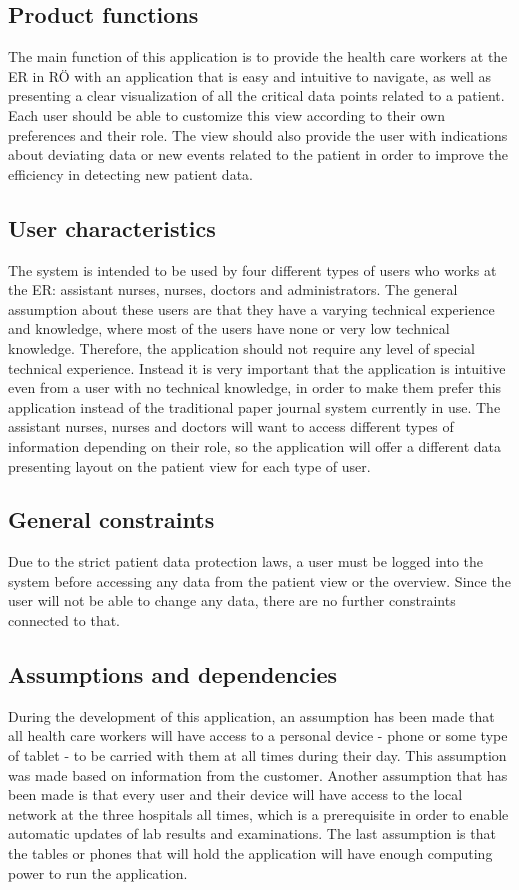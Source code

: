 \subsection{Product functions}
The main function of this application is to provide the health care workers at the ER in RÖ with an application that is easy and intuitive to navigate, as well as presenting a clear visualization of all the critical data points related to a patient. Each user should be able to customize this view according to their own preferences and their role. The view should also provide the user with indications about deviating data or new events related to the patient in order to improve the efficiency in detecting new patient data.

\subsection{User characteristics}
The system is intended to be used by four different types of users who works at the ER: assistant nurses, nurses, doctors and administrators. The general assumption about these users are that they have a varying technical experience and knowledge, where most of the users have none or very low technical knowledge. Therefore, the application should not require any level of special technical experience. Instead it is very important that the application is intuitive even from a user with no technical knowledge, in order to make them prefer this application instead of the traditional paper journal system currently in use.
The assistant nurses, nurses and doctors will want to access different types of information depending on their role, so the application will offer a different data presenting layout on the patient view for each type of user. 

\subsection{General constraints}
Due to the strict patient data protection laws, a user must be logged into the system before accessing any data from the patient view or the overview. Since the user will not be able to change any data, there are no further constraints connected to that. 

\subsection{Assumptions and dependencies}
During the development of this application, an assumption has been made that all health care workers will have access to a personal device - phone or some type of tablet - to be carried with them at all times during their day. This assumption was made based on information from the customer. Another assumption that has been made is that every user and their device will have access to the local network at the three hospitals all times, which is a prerequisite in order to enable automatic updates of lab results and examinations. The last assumption is that the tables or phones that will hold the application will have enough computing power to run the application.  
